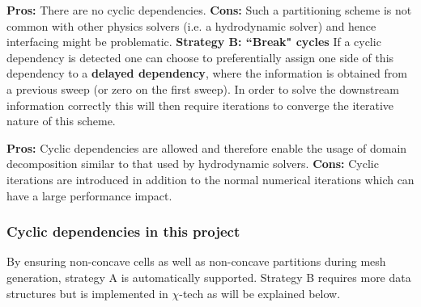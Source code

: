 \documentclass[11pt,letterpaper,titlepage]{article}
\numberwithin{equation}{section}
\begin{document}
\textbf{Pros:} There are no cyclic dependencies.\newline
\textbf{Cons:} Such a partitioning scheme is not common with other physics solvers (i.e. a hydrodynamic solver) and hence interfacing might be problematic. 
\newline
\newline
\textbf{Strategy B: ``Break" cycles}\newline
If a cyclic dependency is detected one can choose to preferentially assign one side of this dependency to a \textbf{delayed dependency}, where the information is obtained from a previous sweep (or zero on the first sweep). In order to solve the downstream information correctly this will then require iterations to converge the iterative nature of this scheme.

\textbf{Pros:} Cyclic dependencies are allowed and therefore enable the usage of domain decomposition similar to that used by hydrodynamic solvers.\newline
\textbf{Cons:} Cyclic iterations are introduced in addition to the normal numerical iterations which can have a large performance impact.

\subsubsection{Cyclic dependencies in this project}
By ensuring non-concave cells as well as non-concave partitions during mesh generation, strategy A is automatically supported. Strategy B requires more data structures but is implemented in $\chi$-tech as will be explained below.
\end{document}
